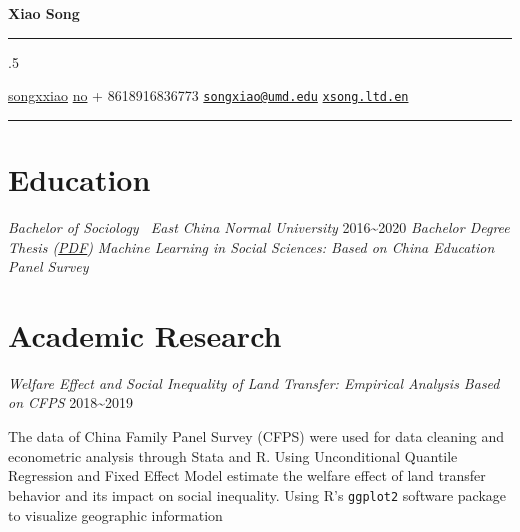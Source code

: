 \documentclass[11pt,]{article}
\begin{document}
\centerline{\huge \bf Xiao Song}

\vspace{2 mm}

\hrule

\vspace{2 mm}


\moveleft.5\hoffset\centerline{ 
\faGithub \hspace{1 mm} \href{http://github.com/songxxiao}{\color{black} songxxiao} \hspace{1 mm}   
\faTwitter \hspace{1 mm} \href{http://twitter.com/no}{\color{black} no} \hspace{1 mm}   
 \faMobile \hspace{1 mm}  + 8618916836773  \hspace{1 mm}  
\faEnvelopeO \hspace{1 mm} \href{mailto:}{\color{black} \href{mailto:songxiao@umd.edu}{\nolinkurl{songxiao@umd.edu}}} \hspace{1 mm} 
\faGlobe \hspace{1 mm} \href{http://xsong.ltd.en}{\tt xsong.ltd.en}   }


\vspace{2 mm}

\hrule


\hypertarget{education}{%
\section{Education}\label{education}}

\emph{Bachelor of Sociology ~East China Normal University}
\hfill 2016\textasciitilde2020 \emph{Bachelor Degree Thesis
(\href{https://xsong.ltd/mlinss.pdf}{PDF})} \emph{Machine Learning in
Social Sciences: Based on China Education Panel Survey}

\hypertarget{academic-research}{%
\section{Academic Research}\label{academic-research}}

\emph{Welfare Effect and Social Inequality of Land Transfer: Empirical
Analysis Based on CFPS} \hfill 2018\textasciitilde2019

The data of China Family Panel Survey (CFPS) were used for data cleaning
and econometric analysis through Stata and R. Using Unconditional
Quantile Regression and Fixed Effect Model estimate the welfare effect
of land transfer behavior and its impact on social inequality. Using R's
\texttt{ggplot2} software package to visualize geographic information
\end{document}
